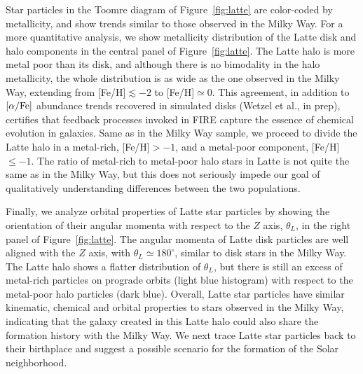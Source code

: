 \documentclass[apj, twocolappendix, numberedappendix, appendixfloats]{emulateapj}
\begin{document}
Star particles in the Toomre diagram of Figure~\ref{fig:latte} are color-coded by metallicity, and show trends similar to those observed in the Milky Way.
For a more quantitative analysis, we show metallicity distribution of the Latte disk and halo components in the central panel of Figure~\ref{fig:latte}.
The Latte halo is more metal poor than its disk, and although there is no bimodality in the halo metallicity, the whole distribution is as wide as the one observed in the Milky Way, extending from [Fe/H]$\lesssim-2$ to [Fe/H]$\simeq0$.
This agreement, in addition to $\rm[\alpha/Fe]$ abundance trends recovered in simulated disks (Wetzel et al., in prep), certifies that feedback processes invoked in FIRE capture the essence of chemical evolution in galaxies.
Same as in the Milky Way sample, we proceed to divide the Latte halo in a metal-rich, [Fe/H]$>-1$, and a metal-poor component, [Fe/H]$\leq-1$.
The ratio of metal-rich to metal-poor halo stars in Latte is not quite the same as in the Milky Way, but this does not seriously impede our goal of qualitatively understanding differences between the two populations.

Finally, we analyze orbital properties of Latte star particles by showing the orientation of their angular momenta with respect to the $Z$ axis, $\theta_L$, in the right panel of Figure~\ref{fig:latte}.
The angular momenta of Latte disk particles are well aligned with the $Z$ axis, with $\theta_L\simeq180^\circ$, similar to disk stars in the Milky Way.
The Latte halo shows a flatter distribution of $\theta_L$, but there is still an excess of metal-rich particles on prograde orbits (light blue histogram) with respect to the metal-poor halo particles (dark blue).
Overall, Latte star particles have similar kinematic, chemical and orbital properties to stars observed in the Milky Way, indicating that the galaxy created in this Latte halo could also share the formation history with the Milky Way.
We next trace Latte star particles back to their birthplace and suggest a possible scenario for the formation of the Solar neighborhood.
\end{document}
